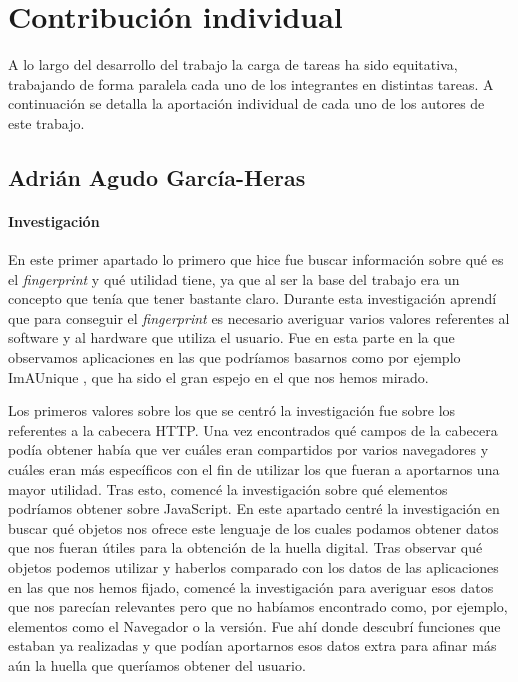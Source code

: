 \chapter{Contribución individual}
A lo largo del desarrollo del trabajo la carga de tareas ha sido equitativa, trabajando de forma paralela cada uno de los integrantes en distintas tareas. A continuación se detalla la aportación individual de cada uno de los autores de este trabajo.

\section{Adrián Agudo García-Heras}
\subsubsection{Investigación}
En este primer apartado lo primero que hice fue buscar información sobre qué es el \textit{fingerprint} y qué utilidad tiene, ya que al ser la base del trabajo era un concepto que tenía que tener bastante claro. Durante esta investigación aprendí que para conseguir el \textit{fingerprint} es necesario averiguar varios valores referentes al software y al hardware que utiliza el usuario. Fue en esta parte en la que observamos aplicaciones en las que podríamos basarnos como por ejemplo ImAUnique \cite{amiunique}, que ha sido el gran espejo en el que nos hemos mirado. \par
Los primeros valores sobre los que se centró la investigación fue sobre los referentes a la cabecera HTTP. Una vez encontrados qué campos de la cabecera podía obtener había que ver cuáles eran compartidos por varios navegadores y cuáles eran más específicos con el fin de utilizar los que fueran a aportarnos una mayor utilidad.
Tras esto, comencé la investigación sobre qué elementos podríamos obtener sobre JavaScript. En este apartado centré la investigación en buscar qué objetos nos ofrece este lenguaje de los cuales podamos obtener datos que nos fueran útiles para la obtención de la huella digital. Tras observar qué objetos podemos utilizar y haberlos comparado con los datos de las aplicaciones en las que nos hemos fijado, comencé la investigación para averiguar esos datos que nos parecían relevantes pero que no habíamos encontrado como, por ejemplo, elementos como el Navegador o la versión. Fue ahí donde descubrí funciones que estaban ya realizadas y que podían aportarnos esos datos extra para afinar más aún la huella que queríamos obtener del usuario.

